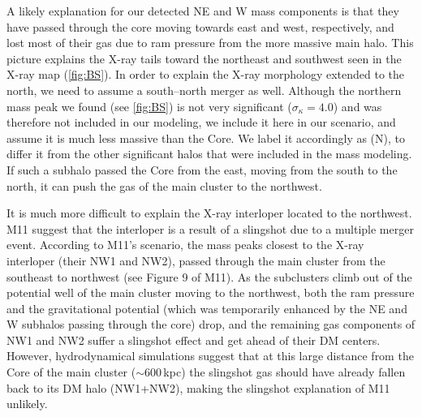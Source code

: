 \documentclass[iop,twocolumn]{emulateapj}
\begin{document}
A likely explanation for our detected NE and W mass components is that they have 
passed through 
the core moving towards east and west, respectively, and lost most of their gas 
due to ram pressure from the more massive main halo.
This picture explains the X-ray tails toward the northeast and southwest 
seen in the X-ray map (\autoref{fig:BS}). 
In order to explain the X-ray morphology extended to the north,
we need to assume a south--north merger as well. 
Although the northern mass peak we found (see \autoref{fig:BS}) is not very significant ($\sigma_\kappa=4.0$) and was therefore not included in our modeling, we include it here in our scenario, and assume it is much less massive than the Core. We label it accordingly as (N), to differ it from the other significant halos that were included in the mass modeling.
%
If such a subhalo passed the Core from the east, moving from the south to the north, it can push the gas of the main cluster to the northwest.



It is much more difficult to explain the X-ray interloper located 
to the northwest.  
M11 suggest that the interloper is a result of a slingshot 
due to a multiple merger event. According to M11's scenario, 
the mass peaks closest to the X-ray interloper (their NW1 and NW2), 
passed through the main cluster from 
the southeast to northwest (see Figure 9 of M11).  
As the subclusters climb out of the potential well of the main cluster 
moving to the northwest, both the ram pressure and the gravitational 
potential (which was temporarily enhanced by the NE and W subhalos 
passing through the core) drop, and the remaining gas components 
of NW1 and NW2 suffer a slingshot effect and get ahead of their DM centers.  
However, hydrodynamical simulations \citep{Molnar2012} suggest that 
at this large distance from the Core of the main cluster ($\sim 600$\,kpc) 
the slingshot gas should have already fallen back to its DM halo (NW1+NW2), 
making the slingshot explanation of M11 unlikely.
\end{document}
